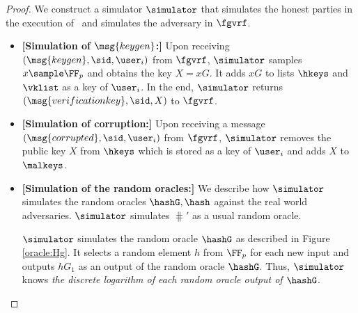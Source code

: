 \begin{proof}
	We construct a simulator $ \simulator $ that simulates the honest parties in the execution of \name \ and simulates the adversary in $ \fgvrf $. 
	\begin{itemize}
		
		\item \textbf{[Simulation of $ \msg{keygen} $:]} Upon receiving $(\msg{keygen}, \sid, \user_i)$ from $\fgvrf$, $ \simulator $ samples $x \sample \FF_p$ and obtains the key $X = xG$. It adds $ xG $ to lists $ \hkeys $ and $ \vklist $ as a key of $ \user_i $. 
		In the end, $ \simulator $ returns $(\msg{verificationkey}, \sid, X)$ to $\fgvrf$. %
		
		\item \textbf{[Simulation of corruption:]} Upon receiving a message $ (\msg{corrupted}, \sid, \user_i) $ from $ \fgvrf $, $ \simulator $ removes the public key $ X $ from $ \hkeys $ which is stored as a key of $ \user_i $ and adds $ X $ to $ \malkeys $.
		
		\item\textbf{[Simulation of the random oracles:]} We  describe how $ \simulator $ simulates the random oracles $ \hashG, \hash $ against the real world adversaries. 	$ \simulator $ simulates  $ \hash' $  as a usual random oracle.
		
		
		$ \simulator $ simulates the random oracle $ \hashG $ as described in Figure \ref{oracle:Hg}. It selects a random element  $ h $ from $ \FF_p $ for each new input and outputs $ hG_1 $ as an output of the random oracle $ \hashG $. Thus, $ \simulator $ knows \emph{the discrete logarithm of each random oracle output of $\hashG  $}. 
		\begin{figure}
			\centering
			
			\noindent{}
\end{figure}
\end{itemize}
\end{proof}
